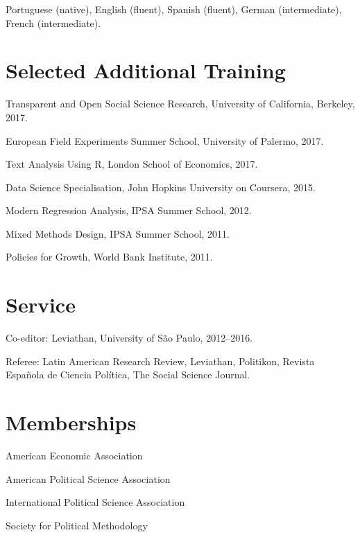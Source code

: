 \documentclass[a4paper]{article}
\renewenvironment{itemize}{
	\begin{list}{}{
			\setlength{\leftmargin}{1.5em}
		}
		}{
	\end{list}
}
\begin{document}
	\begin{itemize}
		\item Portuguese (native), English (fluent), Spanish (fluent), German (intermediate), French (intermediate).
	\end{itemize}

	\section*{Selected Additional Training}

	\begin{itemize}
		\item Transparent and Open Social Science Research, University of California, Berkeley, 2017. %
		\item European Field Experiments Summer School, University of Palermo, 2017.
		\item Text Analysis Using R, London School of Economics, 2017.
		\item Data Science Specialisation, John Hopkins University on Coursera, 2015.
		\item Modern Regression Analysis, IPSA Summer School, 2012.
		\item Mixed Methods Design, IPSA Summer School, 2011.
		\item Policies for Growth, World Bank Institute, 2011.
	\end{itemize}

	\section*{Service}

	\begin{itemize}
		\item Co-editor: Leviathan, University of São Paulo, 2012--2016.
		\item Referee: Latin American Research Review, Leviathan, Politikon, Revista Española de Ciencia Política, The Social Science Journal.
	\end{itemize}

	\section*{Memberships}

	\begin{itemize}
		\item American Economic Association
		\item American Political Science Association
		\item International Political Science Association
		\item Society for Political Methodology
	\end{itemize}
\end{document}
